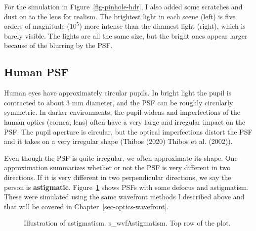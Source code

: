 \documentclass[
  letterpaper,
]{book}
\begin{document}
For the simulation in Figure~\ref{fig-pinhole-hdr}, I also added some
scratches and dust on to the lens for realism. The brightest light in
each scene (left) is five orders of magnitude (\(10^5\)) more intense
than the dimmest light (right), which is barely visible. The lights are
all the same size, but the bright ones appear larger because of the
blurring by the PSF.

\subsection{Human PSF}\label{human-psf}

Human eyes have approximately circular pupils. In bright light the pupil
is contracted to about 3 mm diameter, and the PSF can be roughly
circularly symmetric. In darker environments, the pupil widens and
imperfections of the human optics (cornea, lens) often have a very large
and irregular impact on the PSF. The pupil aperture is circular, but the
optical imperfections distort the PSF and it takes on a very irregular
shape (Thibos (2020) Thibos et al. (2002)).

Even though the PSF is quite irregular, we often approximate its shape.
One approximation summarizes whether or not the PSF is very different in
two directions. If it is very different in two perpendicular directions,
we say the person is \textbf{astigmatic}. Figure~\ref{fig-astigmatism}
shows PSFs with some defocus and astigmatism. These were simulated using
the same wavefront methods I described above and that will be covered in
Chapter~\ref{sec-optics-wavefront}.

\begin{figure}


\caption{\label{fig-astigmatism}Illustration of astigmatism.
s\_wvfAstigmatism. Top row of the plot.}

\end{figure}%
\end{document}
